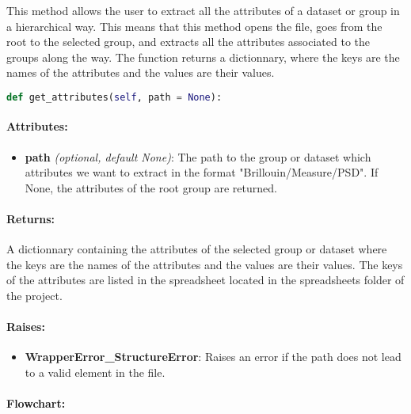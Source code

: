 This method allows the user to extract all the attributes of a dataset or group in a hierarchical way. This means that this method opens the file, goes from the root to the selected group, and extracts all the attributes associated to the groups along the way. The function returns a dictionnary, where the keys are the names of the attributes and the values are their values.


\begin{lstlisting}[language=Python]
def get_attributes(self, path = None):
\end{lstlisting}

\paragraph{Attributes:}

\begin{itemize}
    \item \textbf{path} \textit{(optional, default None)}: The path to the group or dataset which attributes we want to extract in the format "Brillouin/Measure/PSD". If None, the attributes of the root group are returned.
\end{itemize}

\paragraph{Returns:} A dictionnary containing the attributes of the selected group or dataset where the keys are the names of the attributes and the values are their values. The keys of the attributes are listed in the spreadsheet located in the spreadsheets folder of the project.

\paragraph{Raises:}

\begin{itemize}
    \item \textbf{WrapperError\_StructureError}: Raises an error if the path does not lead to a valid element in the file.
\end{itemize}

\paragraph{Flowchart:}

